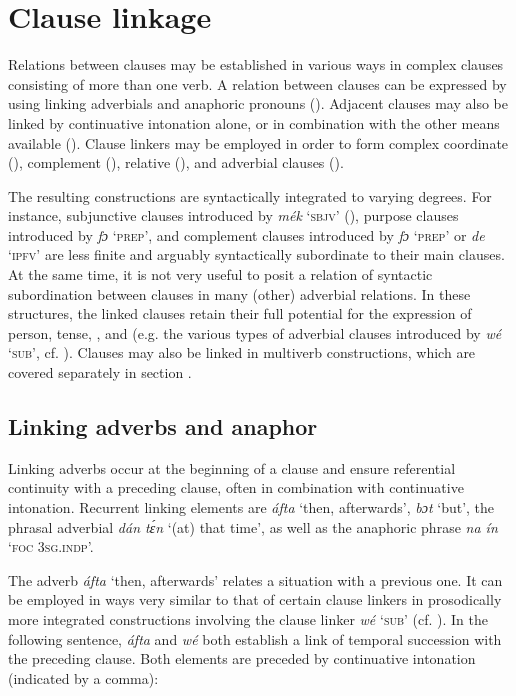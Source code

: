 \chapter{Clause linkage}
\label{sec:10}

Relations between clauses may be established in various ways in complex clauses consisting of more than one verb. A relation between clauses can be expressed by using linking adverbials and anaphoric pronouns (). Adjacent clauses may also be linked by continuative intonation alone, or in combination with the other means available (). Clause linkers may be employed in order to form complex coordinate (), complement (), relative (), and adverbial clauses (). 


The resulting constructions are syntactically integrated to varying degrees. For instance, subjunctive clauses introduced by \textit{mék} ‘\textsc{sbjv}’ (), purpose clauses introduced by \textit{fɔ} ‘\textsc{prep’}, and complement clauses introduced by \textit{fɔ} ‘\textsc{prep’} or \textit{de} ‘\textsc{ipfv’} are less finite and arguably syntactically subordinate to their main clauses. At the same time, it is not very useful to posit a relation of syntactic subordination between clauses in many (other) adverbial relations. In these structures, the linked clauses retain their full potential for the expression of person, tense, , and  (e.g. the various types of adverbial clauses introduced by \textit{wé} ‘\textsc{sub}’, cf. ). Clauses may also be linked in multiverb constructions, which are covered separately in section .


\section{Linking adverbs and anaphor}\label{sec:10.1}

Linking adverbs occur at the beginning of a clause and ensure referential continuity with a preceding clause, often in combination with continuative intonation. Recurrent linking elements are \textit{áfta} ‘then, afterwards’, \textit{bɔt} ‘but’, the phrasal adverbial \textit{dán tɛ́n} ‘(at) that time’, as well as the anaphoric phrase \textit{na ín} ‘\textsc{foc 3sg.indp}’. 


The adverb \textit{áfta} ‘then, afterwards’ relates a situation with a previous one. It can be employed in ways very similar to that of certain clause linkers in prosodically more integrated constructions involving the clause linker \textit{wé} ‘\textsc{sub}’ (cf. ). In the following sentence, \textit{áfta} and \textit{wé} both establish a link of temporal succession with the preceding clause. Both elements are preceded by continuative intonation (indicated by a comma): 



